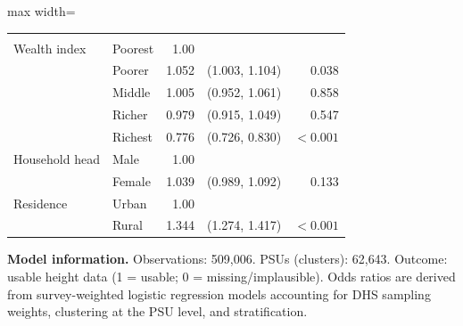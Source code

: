 \begin{table}[htbp]
\begin{threeparttable}
\begin{adjustbox}{max width=\textwidth}
\begin{tabularx}{\textwidth}{X l r r r}
\addlinespace[4pt]
\multicolumn{5}{l}{\textbf{Household characteristics}}\\
\addlinespace[2pt]

Wealth index & Poorest & 1.00 &  &  \\
            & Poorer  & 1.052 & (1.003, 1.104) & 0.038 \\
            & Middle  & 1.005 & (0.952, 1.061) & 0.858 \\
            & Richer  & 0.979 & (0.915, 1.049) & 0.547 \\
            & Richest & 0.776 & (0.726, 0.830) & \(<0.001\) \\

Household head & Male   & 1.00 &  &  \\
               & Female & 1.039 & (0.989, 1.092) & 0.133 \\

Residence & Urban & 1.00 &  &  \\
          & Rural & 1.344 & (1.274, 1.417) & \(<0.001\) \\

\bottomrule
\end{tabularx}
\end{adjustbox} 

\begin{tablenotes}[flushleft]
\footnotesize
\item \textbf{Model information.} Observations: 509{,}006. PSUs (clusters): 62{,}643. Outcome: usable height data (1 = usable; 0 = missing/implausible). Odds ratios are derived from survey-weighted logistic regression models accounting for DHS sampling weights, clustering at the PSU level, and stratification.
\end{tablenotes}

\end{threeparttable}
\end{table}